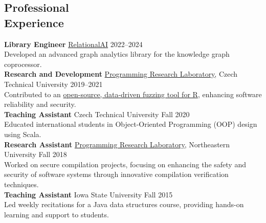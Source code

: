 \documentclass[margin,line]{resume}
\newcommand\mymedskip{10pt}
\begin{document}
\begin{resume}
    \section{\mysidestyle Professional\\Experience}
    \textbf{Library Engineer} \hfill {\href{https://relational.ai/}{RelationalAI}} 2022--2024\\
    {\small Developed an advanced graph analytics library for the knowledge graph coprocessor.}\\[\mymedskip]
    \textbf{Research and Development} \hfill {\href{https://prl-prg.github.io/}{Programming Research Laboratory}}, Czech Technical University 2019--2021\\
    {\small Contributed to an \href{https://dl.acm.org/doi/abs/10.1145/3567512.3567530}{open-source, data-driven fuzzing tool for R}, enhancing software reliability and security.}\\[\mymedskip]
    \textbf{Teaching Assistant} \hfill {Czech Technical University} Fall 2020\\
    {\small Educated international students in Object-Oriented Programming (OOP) design using Scala.}\\[\mymedskip]
    \textbf{Research Assistant} \hfill {\href{https://prl.ccs.neu.edu/}{Programming Research Laboratory}, Northeastern University} Fall 2018\\
    {\small Worked on secure compilation projects, focusing on enhancing the safety and security of software systems through innovative compilation verification techniques.}\\[\mymedskip]
    \textbf{Teaching Assistant} \hfill {Iowa State University} Fall 2015\\
    {\small Led weekly recitations for a Java data structures course, providing hands-on learning and support to students.}
    


\end{resume}
\end{document}
